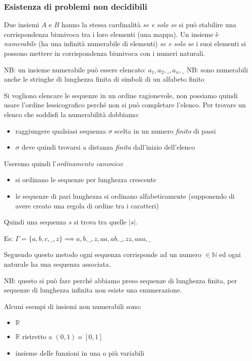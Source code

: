 \subsubsection{Esistenza di problemi non decidibili}
Due insiemi $A$ e $B$ hanno la stessa cardinalità \emph{se e solo se} si può stabilire una corrispondenza biunivoca tra i loro elementi (una mappa).
Un insieme è \emph{numerabile} (ha una infinità numerabile di elementi) \emph{se e solo se} i suoi elementi si possono mettere in corrispondenza biunivoca con i numeri naturali.

NB: un insieme numerabile può essere elencato: $a_1, a_2, \_, a_n, \_ $
NB: sono numerabili anche le stringhe di lunghezza finita di simboli di un alfabeto finito

Si vogliono elencare le sequenze in un ordine ragionevole, non possiamo quindi usare l'ordine lessicografico perché non si può completare l'elenco. Per trovare un elenco che soddisfi la numerabilità dobbiamo:
\begin{itemize}
    \item raggiungere qualsiasi sequenza $\sigma$ scelta in un numero \emph{finito} di passi
    \item $\sigma$ deve quindi trovarsi a distanza \emph{finita} dall'inizio dell'elenco
\end{itemize}

Useremo quindi l'\emph{ordinamento canonico}:
\begin{itemize}
    \item si ordinano le sequenze per lunghezza crescente
    \item le sequenze di pari lunghezza si ordinano alfabeticamente (supponendo di avere creato una regola di ordine tra i caratteri)
\end{itemize}

Quindi una sequenza $s$ si trova tra quelle $|s|$.

Es: $\Gamma = \{ a, b, c, \_, z \} \implies a, b, \_, z, aa, ab, \_, zz, aaa, \_ $

Seguendo questo metodo ogni sequenza corrisponde ad un numero $\in \mathbb{N}$ ed ogni naturale ha una sequenza associata.

NB: questo si può fare perché abbiamo preso sequenze di lunghezza finita, per sequenze di lunghezza infinita non esiste una enumerazione.

Alcuni esempi di insiemi non numerabili sono:
\begin{itemize}
    \item $\mathbb{R}$
    \item $\mathbb{R}$ ristretto a $(0, 1)$ o $[0, 1]$
    \item insieme delle funzioni in una o più variabili
\end{itemize}

